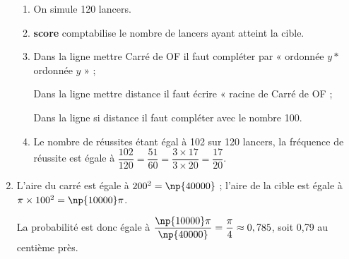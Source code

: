 \begin{enumerate}
	\begin{enumerate}
		\item %
On simule 120 lancers.
		\item %
		\textbf{score} comptabilise le nombre de lancers ayant atteint la cible.
		\item %
Dans la ligne mettre Carré de OF il faut compléter par « ordonnée $y *$ ordonnée $y$ » ;

Dans la ligne mettre distance il faut écrire « racine de Carré de OF\fg{} ;

Dans la ligne si distance il faut compléter avec le nombre 100.
		\item %
		
		
Le nombre de réussites étant égal à 102 sur 120 lancers, la fréquence de réussite est égale à $\dfrac{102}{120} = \dfrac{51}{60} = \dfrac{3 \times 17}{3 \times 20} = \dfrac{17}{20}$.
	\end{enumerate}
\item  %
	
L'aire du carré est égale à $200^2 = \np{40000}$ ; l'aire de la cible est égale à $\pi \times 100^2 = \np{10000}\pi$.

La probabilité est donc égale à $\dfrac{\np{10000}\pi}{\np{40000}} = \dfrac{\pi}{4} \approx 0,785$, soit 0,79 au centième près.


\end{enumerate}
 
\vspace{0,5cm}

